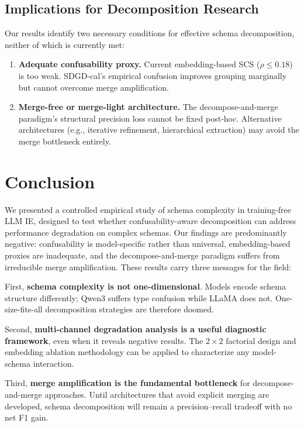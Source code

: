 \documentclass[11pt,a4paper]{article}
\begin{document}
\subsection{Implications for Decomposition Research}

Our results identify two necessary conditions for effective schema decomposition, neither of which is currently met:

\begin{enumerate}
\item \textbf{Adequate confusability proxy.} Current embedding-based SCS ($\rho \leq 0.18$) is too weak. SDGD-cal's empirical confusion improves grouping marginally but cannot overcome merge amplification.
\item \textbf{Merge-free or merge-light architecture.} The decompose-and-merge paradigm's structural precision loss cannot be fixed post-hoc. Alternative architectures (e.g., iterative refinement, hierarchical extraction) may avoid the merge bottleneck entirely.
\end{enumerate}

\section{Conclusion}
\label{sec:conclusion}

We presented a controlled empirical study of schema complexity in training-free LLM IE, designed to test whether confusability-aware decomposition can address performance degradation on complex schemas. Our findings are predominantly negative: confusability is model-specific rather than universal, embedding-based proxies are inadequate, and the decompose-and-merge paradigm suffers from irreducible merge amplification. These results carry three messages for the field:

First, \textbf{schema complexity is not one-dimensional}. Models encode schema structure differently; Qwen3 suffers type confusion while LLaMA does not. One-size-fits-all decomposition strategies are therefore doomed.

Second, \textbf{multi-channel degradation analysis is a useful diagnostic framework}, even when it reveals negative results. The $2{\times}2$ factorial design and embedding ablation methodology can be applied to characterize any model-schema interaction.

Third, \textbf{merge amplification is the fundamental bottleneck} for decompose-and-merge approaches. Until architectures that avoid explicit merging are developed, schema decomposition will remain a precision--recall tradeoff with no net F1 gain.
\end{document}
